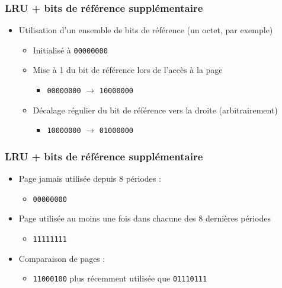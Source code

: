 \begin{frame}
\frametitle{LRU + bits de référence supplémentaire}
\begin{itemize}
\item Utilisation d'un ensemble de bits de référence (un octet, par exemple)
\begin{itemize}
\item Initialisé à \texttt{00000000}
\item Mise à 1 du bit de référence lors de l'accès à la page
\begin{itemize}
\item \texttt{00000000} $\rightarrow$ \texttt{10000000}
\end{itemize}
\item Décalage régulier du bit de référence vers la droite (arbitrairement)
\begin{itemize}
\item \texttt{10000000} $\rightarrow$ \texttt{01000000}
\end{itemize}
\end{itemize}
\end{itemize}

\end{frame}


\begin{frame}
\frametitle{LRU + bits de référence supplémentaire}
\begin{itemize}
\item Page jamais utilisée depuis 8 périodes :
\begin{itemize}
\item \texttt{00000000}
\end{itemize}
\item Page utilisée au moins une fois dans chacune des 8 dernières périodes
\begin{itemize}
\item \texttt{11111111}
\end{itemize}
\item Comparaison de pages :
\begin{itemize}
\item \texttt{11000100} plus récemment utilisée que \texttt{01110111}
\end{itemize}
\end{itemize}
\end{frame}


